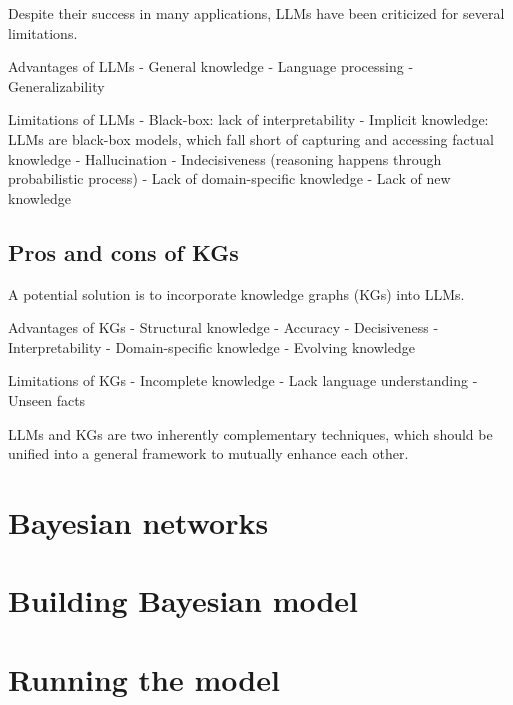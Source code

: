 \documentclass[11pt, reqno]{amsart}
\theoremstyle{definition}
\theoremstyle{remark}
\begin{document}
    Despite their success in many applications, LLMs have been criticized for
    several limitations.

    Advantages of LLMs
    - General knowledge
    - Language processing
    - Generalizability

    Limitations of LLMs
    - Black-box: lack of interpretability
    - Implicit knowledge: LLMs are black-box models, which fall short of
      capturing and accessing factual knowledge
    - Hallucination
    - Indecisiveness (reasoning happens through probabilistic process)
    - Lack of domain-specific knowledge
    - Lack of new knowledge

    \subsection{Pros and cons of KGs}

    A potential solution is to incorporate knowledge graphs (KGs) into LLMs.
    
    Advantages of KGs
    - Structural knowledge
    - Accuracy
    - Decisiveness
    - Interpretability
    - Domain-specific knowledge
    - Evolving knowledge

    Limitations of KGs
    - Incomplete knowledge
    - Lack language understanding
    - Unseen facts

    LLMs and KGs are two inherently complementary techniques, which should be
    unified into a general framework to mutually enhance each other.

	\section{Bayesian networks}


	\section{Building Bayesian model}


	\section{Running the model}


	
	

	\begin{thebibliography}{10}

	\end{thebibliography}
\end{document}
